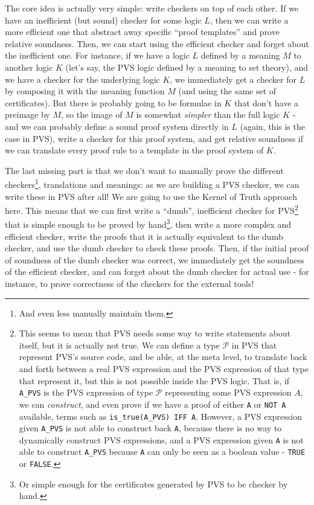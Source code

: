 \documentclass[utf8,a4paper]{article}
\begin{document}
The core idea is actually very simple: write checkers on top of each
other. If we have an inefficient (but sound) checker for some logic
$L$, then we can write a more efficient one that abstract away
specific ``proof templates'' and prove relative soundness. Then, we
can start using the efficient checker and forget about the inefficient
one. For instance, if we have a logic $L$ defined by a meaning $M$ to
another logic $K$ (let's say, the PVS logic defined by a meaning to
set theory), and we have a checker for the underlying logic $K$, we
immediately get a checker for $L$ by composing it with the meaning
function $M$ (and using the same set of certificates). But there is
probably going to be formulae in $K$ that don't have a preimage by
$M$, so the image of $M$ is somewhat \textit{simpler} than the full
logic $K$ - and we can probably define a sound proof system directly
in $L$ (again, this is the case in PVS), write a checker for this
proof system, and get relative soundness if we can translate every
proof rule to a template in the proof system of $K$.

The last missing part is that we don't want to manually prove the
different checkers\footnote{And even less manually maintain them.},
translations and meanings: as we are building a PVS checker, we can
write these in PVS after all! We are going to use the Kernel of Truth
approach here. This means that we can first write a ``dumb'',
inefficient checker for PVS\footnote{This seems to mean that PVS needs
  some way to write statements about itself, but it is actually not
  true. We can define a type $\mathcal{P}$ in PVS that represent PVS's
  source code, and be able, at the meta level, to translate back and
  forth between a real PVS expression and the PVS expression of that
  type that represent it, but this is not possible inside the PVS
  logic. That is, if \verb!A_PVS! is the PVS expression of type
  $\mathcal{P}$ representing some PVS expression $A$, we can
  \textit{construct}, and even prove if we have a proof of either
  \verb!A! or \verb!NOT A! available, terms such as
  \verb!is_true(A_PVS) IFF A!. However, a PVS expression given
  \verb!A_PVS! is not able to construct back \verb!A!, because there
  is no way to dynamically construct PVS expressions, and a PVS
  expression given \verb!A! is not able to construct \verb!A_PVS!
  because \verb!A! can only be seen as a boolean value - \verb!TRUE!
  or \verb!FALSE!.} that is simple enough to be proved by
hand\footnote{Or simple enough for the certificates generated by PVS
  to be checker by hand.}, then write a more complex and efficient
checker, write the proofs that it is actually equivalent to the dumb
checker, and use the dumb checker to check these proofs. Then, if the
initial proof of soundness of the dumb checker was correct, we
immediately get the soundness of the efficient checker, and can forget
about the dumb checker for actual use - for instance, to prove
correctness of the checkers for the external tools!
\end{document}
